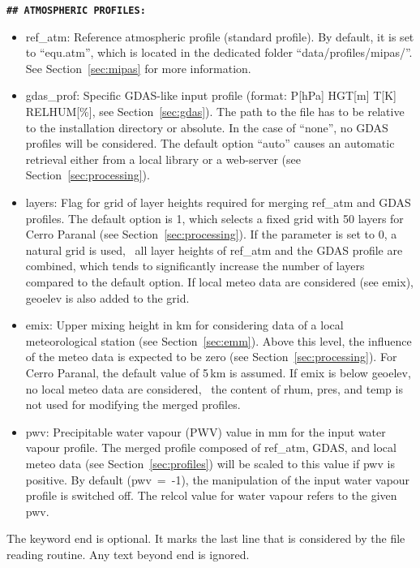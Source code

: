 {\bf\large\tt\#\# ATMOSPHERIC PROFILES:}
\begin{itemize}
\item {\sc ref\_atm}: Reference atmospheric profile (standard profile). By
default, it is set to ``equ.atm'', which is located in the dedicated folder
``data/profiles/mipas/''. See Section~\ref{sec:mipas} for more information.
\item {\sc gdas\_prof}: Specific GDAS-like input profile (format:
P[hPa] HGT[m] T[K] RELHUM[\%], see Section~\ref{sec:gdas}). The path to the
file has to be relative to the installation directory or absolute. In the case of ``none'',
no GDAS profiles will be considered. The default option ``auto'' causes an
automatic retrieval either from a local library or a web-server (see
Section~\ref{sec:processing}).
\item {\sc layers}: Flag for grid of layer heights required for merging
{\sc ref\_atm} and GDAS profiles. The default option is 1, which selects a
fixed grid with 50 layers for Cerro Paranal (see Section~\ref{sec:processing}).
If the parameter is set to 0, a natural grid is used, \ie\ all layer heights of
{\sc ref\_atm} and the GDAS profile are combined, which tends to significantly
increase the number of layers compared to the default option. If local meteo
data are considered (see {\sc emix}), {\sc geoelev} is also added to the grid.
\item {\sc emix}: Upper mixing height in km for considering data of a local
meteorological station (see Section~\ref{sec:emm}). Above this level, the
influence of the meteo data is expected to be zero (see
Section~\ref{sec:processing}). For Cerro Paranal, the default value of 5\,km
is assumed. If {\sc emix} is below {\sc geoelev}, no local meteo data are
considered, \ie\ the content of {\sc rhum}, {\sc pres}, and {\sc temp} is
not used for modifying the merged profiles.
\item {\sc pwv}: Precipitable water vapour (PWV) value in mm for the input
water vapour profile. The merged profile composed of {\sc ref\_atm}, GDAS, and
local meteo data (see Section~\ref{sec:profiles}) will be scaled to this value
if {\sc pwv} is positive. By default ({\sc pwv}~=~-1), the manipulation of the
input water vapour profile is switched off. The {\sc relcol} value for water
vapour refers to the given {\sc pwv}.
\end{itemize}

The keyword {\sc end} is optional. It marks the last line that is considered by
the file reading routine. Any text beyond {\sc end} is ignored.

